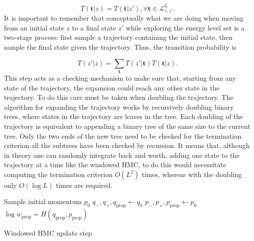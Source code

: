 \documentclass[12pt]{report}
\begin{document}
\[T(\mathbf{t}|z) = T(\mathbf{t}|z') , \forall \mathbf{t} \in \mathcal{L}^L_{z,z'} . \]
It is important to remember that conceptually what we are doing when moving from an initial state $z$ to a final state $z'$ while exploring the energy level set is a two-stage process: first sample a trajectory containing the initial state, then sample the final state given the trajectory.  Thus, the transition probability is 

\[T(z'|z) = \sum_{\mathbf{t}} T(z'|\mathbf{t}) T(\mathbf{t}|z). \]
This step acts as a checking mechanism to make sure that, starting from any state of the trajectory, the expansion could reach any other state in the trajectory. To do this care must be taken when doubling the trajectory. The algorithm for expanding the trajectory works by recursively doubling binary trees, where states in the trajectory are leaves in the tree. Each doubling of the trajectory is equivalent to appending a binary tree of the same size to the current tree. Only the two ends of the new tree need to be checked for the termination criterion all the subtrees have been checked by recursion.
It means that, although in theory one can randomly integrate back and worth, adding one state to the trajectory at a time like the windowed HMC, to do this would necessitate  computing the termination criterion $O(L^2)$ times, whereas with the doubling only $O(\log L)$ times are required. 



\begin{algorithm}
Sample initial momentum $p_0$ \;
$q_-,q_+, q_{\text{prop}} \leftarrow q_0$\;
$p_-,p_+, p_{\text{prop}} \leftarrow p_0$ \;
$\log w_{\text{prop}} = H(q_{\text{prop}},p_{\text{prop}}) $ \;

\caption{Windowed HMC update step}
\end{algorithm}
\end{document}
